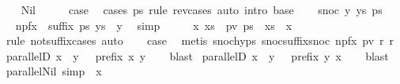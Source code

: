 \begin{isabellebody}
\ \ \isamarkupfalse%
\ Nil\isanewline
\ \ \isamarkupfalse%
\ \isamarkupfalse%
\ {\isacharquery}case\ \isamarkupfalse%
\ {\isacharparenleft}cases\ ps\ rule{\isacharcolon}\ rev{\isacharunderscore}cases{\isacharparenright}\ {\isacharparenleft}auto\ intro{\isacharcolon}\ base{\isacharparenright}\isanewline
{}\isamarkupfalse%
\isanewline
\ \ \isamarkupfalse%
\ {\isacharparenleft}snoc\ y\ ys\ ps{\isacharparenright}\isanewline
\ \ \isamarkupfalse%
\ \isamarkupfalse%
\ npfx{\isacharcolon}\ {\isachardoublequoteopen}{\isasymnot}\ suffix\ ps\ {\isacharparenleft}ys\ {\isacharat}\ {\isacharbrackleft}y{\isacharbrackright}{\isacharparenright}{\isachardoublequoteclose}\ \isamarkupfalse%
\ simp\isanewline
\ \ \isamarkupfalse%
\ \isamarkupfalse%
\ x\ xs\ \ pv{\isacharcolon}\ {\isachardoublequoteopen}ps\ {\isacharequal}\ xs\ {\isacharat}\ {\isacharbrackleft}x{\isacharbrackright}{\isachardoublequoteclose}\isanewline
\ \ \ \ \isamarkupfalse%
\ {\isacharparenleft}rule\ not{\isacharunderscore}suffix{\isacharunderscore}cases{\isacharparenright}\ auto\isanewline
\ \ \isamarkupfalse%
\ {\isacharquery}case\ \isamarkupfalse%
\ {\isacharparenleft}metis\ snoc{\isachardot}hyps\ snoc{\isacharunderscore}suffix{\isacharunderscore}snoc\ npfx\ pv\ r{}\ r{}{\isacharparenright}\isanewline
{}\isamarkupfalse%
%
\endisatagproof
{\isafoldproof}%
%
\isadelimproof
%
\endisadelimproof
\isanewline
\isanewline
\isanewline
{}\isamarkupfalse%
\ parallelD{}{\isacharcolon}\ {\isachardoublequoteopen}x\ {\isasymparallel}\ y\ {\isasymLongrightarrow}\ {\isasymnot}\ prefix\ x\ y{\isachardoublequoteclose}\isanewline
%
\isadelimproof
\ \ %
\endisadelimproof
%
\isatagproof
{}\isamarkupfalse%
\ blast%
\endisatagproof
{\isafoldproof}%
%
\isadelimproof
\isanewline
%
\endisadelimproof
\isanewline
{}\isamarkupfalse%
\ parallelD{}{\isacharcolon}\ {\isachardoublequoteopen}x\ {\isasymparallel}\ y\ {\isasymLongrightarrow}\ {\isasymnot}\ prefix\ y\ x{\isachardoublequoteclose}\isanewline
%
\isadelimproof
\ \ %
\endisadelimproof
%
\isatagproof
{}\isamarkupfalse%
\ blast%
\endisatagproof
{\isafoldproof}%
%
\isadelimproof
\isanewline
%
\endisadelimproof
\isanewline
{}\isamarkupfalse%
\ parallel{\isacharunderscore}Nil{}\ {\isacharbrackleft}simp{\isacharbrackright}{\isacharcolon}\ {\isachardoublequoteopen}{\isasymnot}\ x\ {\isasymparallel}\ {\isacharbrackleft}{\isacharbrackright}{\isachardoublequoteclose}\isanewline

\end{isabellebody}
